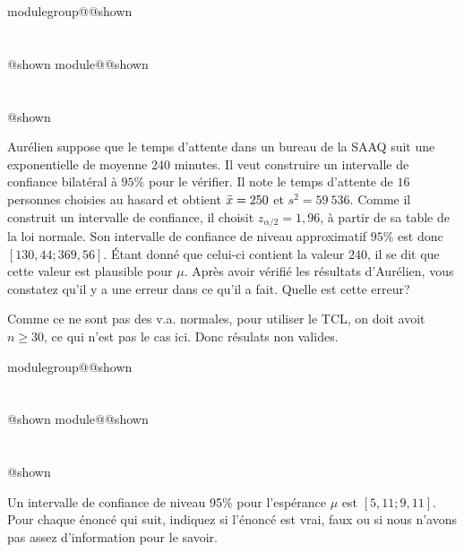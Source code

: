 \documentclass{Evaluation}
\makeatletter
\newcommand{\currentmodulekey}{}
\newcommand{\currentmoduletitle}{}
\newcommand{\currentgroupkey}{}
\newcommand{\currentgrouptitle}{}
\newcommand{\showmoduleifneeded}{%
  \ifx\currentgroupkey\empty\else
    \expandafter\ifx\csname modulegroup@\currentgroupkey @shown\endcsname\relax
      \section*{\currentgrouptitle}%
      \expandafter\gdef\csname modulegroup@\currentgroupkey @shown\endcsname{1}%
    \fi
  \fi
  \expandafter\ifx\csname module@\currentmodulekey @shown\endcsname\relax
    \section*{\currentmoduletitle}%
    \expandafter\gdef\csname module@\currentmodulekey @shown\endcsname{1}%
  \fi
}
\newenvironment{H23}{\showmoduleifneeded}{}
\newenvironment{A23}{\showmoduleifneeded}{}
\makeatother
\begin{document}
\begin{questions}
\begin{H23}
\question {} %
Aurélien suppose que le temps d'attente dans un bureau de la SAAQ suit une exponentielle de moyenne 240 minutes. 
Il veut construire un intervalle de confiance bilatéral à $95\%$ pour le vérifier.
Il note le temps d'attente de $16$ personnes choisies au hasard et obtient $\Bar{x}=250$ et $s^2=59~536$.
Comme il construit un intervalle de confiance, il choisit $z_{\alpha/2}=1,96$, à partir de sa table de la loi normale.
Son intervalle de confiance de niveau approximatif $95\%$ est donc $[130,44;369,56]$.
Étant donné que celui-ci contient la valeur $240$, il se dit que cette valeur est plausible pour $\mu$. 
Après avoir vérifié les résultats d'Aurélien, vous constatez qu'il y a une erreur dans ce qu'il a fait. 
Quelle est cette erreur?
\begin{solution}
    Comme ce ne sont pas des v.a. normales, pour utiliser le TCL, on doit avoit $n\geq30$, ce qui n'est pas le cas ici. Donc résulats non valides.
\end{solution}
\end{H23}

\begin{A23}
\question {} %
\label{A23-F1-QCMicTests}
Un intervalle de confiance de niveau 95\% pour l'espérance $\mu$ est $[ 5,11 ; 9,11]$. Pour chaque énoncé qui suit, indiquez si l'énoncé est vrai, faux ou si nous n'avons pas assez d'information pour le savoir.

\medskip

\end{A23}
\end{questions}
\end{document}
